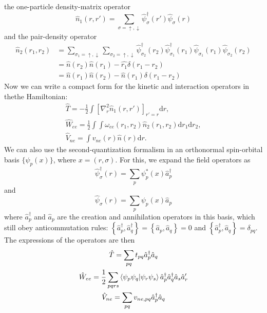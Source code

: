 the one-particle density-matrix operator
\begin{equation}
  \hat{n}_1(r,r')
  = \sum_{\sigma=\uparrow,\downarrow}{\hat{\psi}^\dagger_\sigma(r')\hat{\psi}_\sigma(r)}
\end{equation}
and the pair-density operator
\begin{align}
  \hat{n}_2(r_1,r_2) &=
\sum_{\sigma_1=\uparrow,\downarrow}\sum_{\sigma_2=\uparrow,\downarrow}\hat{\psi}^\dagger_{\sigma_2}(r_2)\hat{\psi}^\dagger_{\sigma_1}(r_1)\hat{\psi}_{\sigma_1}(r_1)\hat{\psi}_{\sigma_2}(r_2)\nonumber\\
&= \hat{n}(r_2)\hat{n}(r_1) - \hat{r_1}\delta(r_1-r_2)\nonumber\\
&= \hat{n}(r_1)\hat{n}(r_2) - \hat{n}(r_1)\delta(r_1 - r_2)
\end{align}
Now we can write a compact form for the kinetic and interaction operators in
thethe Hamiltonian:
\begin{gather}
  \hat{T}
  = -\frac{1}{2}\int\left[\nabla^2_r\hat{n}_1(r,r')\right]_{r'=r}\mathrm{d}r,\\
  \hat{W}_{ee}
  = \frac{1}{2}\int\int\omega_{ee}(r_1,r_2)\hat{n}_2(r_1,r_2)\mathrm{d}r_1\mathrm{d}r_2,\\
  \hat{V}_{ne} = \int v_{ne}(r)\hat{n}(r)\mathrm{d}r.
\end{gather}
We can also use the second-quantization formalism in an orthonormal
spin-orbital basis $\{\psi_p(x)\}$, where $x=(r,\sigma)$. For this, we expand
the field operators as
\begin{equation}
  \hat{\psi}^\dagger_\sigma(r) = \sum_p{\psi_p^*(x)\hat{a}^\dagger_{p}}
\end{equation}
and
\begin{equation}
\hat{\psi}_\sigma(r) = \sum_p \psi_p(x)\hat{a}_p
\end{equation}
where $\hat{a}_p^\dagger$ and $\hat{a}_p$ are the creation and annihilation
operators in this basis, which still obey anticommutation rules:
$\left\{\hat{a}_p^\dagger, \hat{a}_q^\dagger\right\}
= \left\{\hat{a}_p,\hat{a}_q\right\} = 0$ and $\left\{\hat{a}_p^\dagger,
\hat{a}_q\right\} = \delta_{pq}$. The expressions of the operators are then
\begin{gather}
  \hat{T} = \sum_{pq}t_{pq}\hat{a}_p^\dagger\hat{a}_q\\
  \hat{W}_{ee}
  = \frac{1}{2}\sum_{pqrs}\bra{\psi_p\psi_q}\ket{\psi_r\psi_s}\hat{a}_p^\dagger\hat{a}_q^\dagger\hat{a}_s\hat{a}_r'\\
    \hat{V}_{ne} = \sum_{pq}v_{ne,pq}\hat{a}^\dagger_p\hat{a}_q
  \end{gather}
